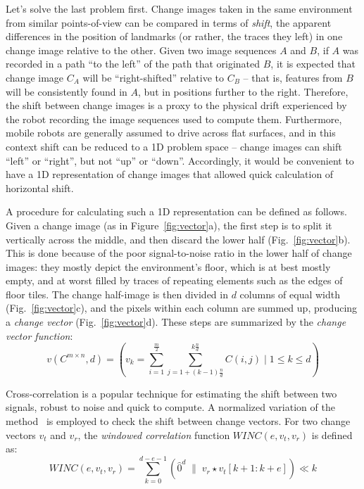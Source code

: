 \documentclass[twocolumn, 9pt,fleqn]{jsproceedings}
\begin{document}
Let's solve the last problem first. Change images taken in the same environment from similar points-of-view can be compared in terms of \textit{shift}, the apparent differences in the position of landmarks (or rather, the traces they left) in one change image relative to the other. Given two image sequences $A$ and $B$, if $A$ was recorded in a path ``to the left'' of the path that originated $B$, it is expected that change image $C_A$ will be ``right-shifted'' relative to $C_B$ -- that is, features from $B$ will be consistently found in $A$, but in positions further to the right. Therefore, the shift between change images is a proxy to the physical drift experienced by the robot recording the image sequences used to compute them. Furthermore, mobile robots are generally assumed to drive across flat surfaces, and in this context shift can be reduced to a 1D problem space -- change images can shift ``left'' or ``right'', but not ``up'' or ``down''. Accordingly, it would be convenient to have a 1D representation of change images that allowed quick calculation of horizontal shift.

A procedure for calculating such a 1D representation can be defined as follows. Given a change image (as in Figure~\ref{fig:vector}a), the first step is to split it vertically across the middle, and then discard the lower half (Fig.~\ref{fig:vector}b). This is done because of the poor signal-to-noise ratio in the lower half of change images: they mostly depict the environment's floor, which is at best mostly empty, and at worst filled by traces of repeating elements such as the edges of floor tiles. The change half-image is then divided in $d$ columns of equal width (Fig.~\ref{fig:vector}c), and the pixels within each column are summed up, producing a \textit{change vector} (Fig.~\ref{fig:vector}d). These steps are summarized by the \textit{change vector function}:
\begin{equation}
v(C^{m \times n}, d) = (v_k = \sum_{i=1}^{\frac{m}{2}} {\sum_{j=1 + (k - 1)\frac{n}{d}}^{k\frac{n}{d}}{C(i, j)}} \; | \; 1 \leq k \leq d)
\end{equation}

Cross-correlation is a popular technique for estimating the shift between two signals, robust to noise and quick to compute. A normalized variation of the method~\cite{HEL14b} is employed to check the shift between change vectors. For two change vectors $v_t$ and $v_r$, the \textit{windowed correlation} function $WINC(e, v_t, v_r)$ is defined as:
\begin{equation}
WINC(e, v_t, v_r) = \sum_{k=0}^{d-e-1}{(\hat{0}^d \; \| \; v_r \star v_t[k+1:k+e]) \ll k}
\end{equation}
\end{document}
